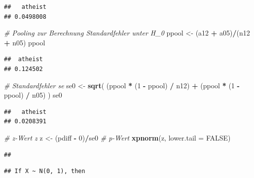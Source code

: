 \documentclass[12pt,ngerman,paper=a4,pagesize,DIV=13]{scrreprt}
\newenvironment{Shaded}{\begin{snugshade}}{\end{snugshade}}
\newcommand{\CommentTok}[1]{\textcolor[rgb]{0.56,0.35,0.01}{\textit{#1}}}
\newcommand{\DataTypeTok}[1]{\textcolor[rgb]{0.13,0.29,0.53}{#1}}
\newcommand{\DecValTok}[1]{\textcolor[rgb]{0.00,0.00,0.81}{#1}}
\newcommand{\KeywordTok}[1]{\textcolor[rgb]{0.13,0.29,0.53}{\textbf{#1}}}
\newcommand{\NormalTok}[1]{#1}
\newcommand{\OperatorTok}[1]{\textcolor[rgb]{0.81,0.36,0.00}{\textbf{#1}}}
\newcommand{\OtherTok}[1]{\textcolor[rgb]{0.56,0.35,0.01}{#1}}
\newcommand{\StringTok}[1]{\textcolor[rgb]{0.31,0.60,0.02}{#1}}
\begin{document}
\begin{verbatim}
##   atheist 
## 0.0498008
\end{verbatim}

\begin{Shaded}
\begin{Highlighting}[]
\CommentTok{# Pooling zur Berechnung Standardfehler unter H_0}
\NormalTok{ppool <-}\StringTok{ }\NormalTok{(a12 }\OperatorTok{+}\StringTok{ }\NormalTok{a05)}\OperatorTok{/}\NormalTok{(n12 }\OperatorTok{+}\StringTok{ }\NormalTok{n05)}
\NormalTok{ppool}
\end{Highlighting}
\end{Shaded}

\begin{verbatim}
##  atheist 
## 0.124502
\end{verbatim}

\begin{Shaded}
\begin{Highlighting}[]
\CommentTok{# Standardfehler se}
\NormalTok{se0 <-}\StringTok{ }\KeywordTok{sqrt}\NormalTok{( (ppool }\OperatorTok{*}\StringTok{ }\NormalTok{(}\DecValTok{1} \OperatorTok{-}\StringTok{ }\NormalTok{ppool) }\OperatorTok{/}\StringTok{ }\NormalTok{n12) }\OperatorTok{+}\StringTok{ }\NormalTok{(ppool }\OperatorTok{*}\StringTok{ }\NormalTok{(}\DecValTok{1} \OperatorTok{-}\StringTok{ }\NormalTok{ppool) }\OperatorTok{/}\StringTok{ }\NormalTok{n05) )}
\NormalTok{se0}
\end{Highlighting}
\end{Shaded}

\begin{verbatim}
##   atheist 
## 0.0208391
\end{verbatim}

\begin{Shaded}
\begin{Highlighting}[]
\CommentTok{# z-Wert z}
\NormalTok{z <-}\StringTok{ }\NormalTok{(pdiff }\OperatorTok{-}\StringTok{ }\DecValTok{0}\NormalTok{)}\OperatorTok{/}\NormalTok{se0}
\CommentTok{# p-Wert}
\KeywordTok{xpnorm}\NormalTok{(z, }\DataTypeTok{lower.tail =} \OtherTok{FALSE}\NormalTok{)}
\end{Highlighting}
\end{Shaded}

\begin{verbatim}
## 
\end{verbatim}

\begin{verbatim}
## If X ~ N(0, 1), then
\end{verbatim}
\end{document}
